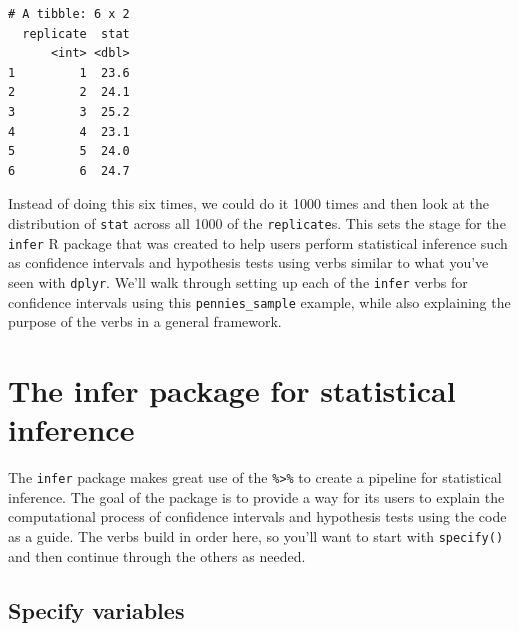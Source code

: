 \documentclass[12pt,]{krantz}
\makeatletter
\newenvironment{Shaded}{\begin{snugshade}}{\end{snugshade}}
\newcommand{\KeywordTok}[1]{\textcolor[rgb]{0.27,0.27,0.27}{\textbf{#1}}}
\newcommand{\DataTypeTok}[1]{\textcolor[rgb]{0.27,0.27,0.27}{#1}}
\newcommand{\DecValTok}[1]{\textcolor[rgb]{0.06,0.06,0.06}{#1}}
\newcommand{\StringTok}[1]{\textcolor[rgb]{0.5,0.5,0.5}{#1}}
\newcommand{\OperatorTok}[1]{\textcolor[rgb]{0.43,0.43,0.43}{\textbf{#1}}}
\newcommand{\NormalTok}[1]{#1}
\newenvironment{kframe}{%
\medskip{}
\setlength{\fboxsep}{.8em}
 \def\at@end@of@kframe{}%
 \ifinner\ifhmode%
  \def\at@end@of@kframe{\end{minipage}}%
  \begin{minipage}{\columnwidth}%
 \fi\fi%
 \def\FrameCommand##1{\hskip\@totalleftmargin \hskip-\fboxsep
 \colorbox{shadecolor}{##1}\hskip-\fboxsep
     \hskip-\linewidth \hskip-\@totalleftmargin \hskip\columnwidth}%
 \MakeFramed {\advance\hsize-\width
   \@totalleftmargin\z@ \linewidth\hsize
   \@setminipage}}%
 {\par\unskip\endMakeFramed%
 \at@end@of@kframe}
\renewenvironment{Shaded}{\begin{kframe}}{\end{kframe}}
\theoremstyle{definition}
\theoremstyle{definition}
\theoremstyle{definition}
\theoremstyle{remark}
\makeatother
\begin{document}
\begin{Shaded}
\end{Shaded}

\begin{verbatim}
# A tibble: 6 x 2
  replicate  stat
      <int> <dbl>
1         1  23.6
2         2  24.1
3         3  25.2
4         4  23.1
5         5  24.0
6         6  24.7
\end{verbatim}

Instead of doing this six times, we could do it 1000 times and then look
at the distribution of \texttt{stat} across all 1000 of the
\texttt{replicate}s. This sets the stage for the \texttt{infer} R
package \citep{R-infer} that was created to help users perform
statistical inference such as confidence intervals and hypothesis tests
using verbs similar to what you've seen with \texttt{dplyr}. We'll walk
through setting up each of the \texttt{infer} verbs for confidence
intervals using this \texttt{pennies\_sample} example, while also
explaining the purpose of the verbs in a general framework.

\section{The infer package for statistical
inference}\label{the-infer-package-for-statistical-inference}

The \texttt{infer} package makes great use of the
\texttt{\%\textgreater{}\%} to create a pipeline for statistical
inference. The goal of the package is to provide a way for its users to
explain the computational process of confidence intervals and hypothesis
tests using the code as a guide. The verbs build in order here, so
you'll want to start with \texttt{specify()} and then continue through
the others as needed.

\subsection{Specify variables}\label{specify-variables}
\end{document}
